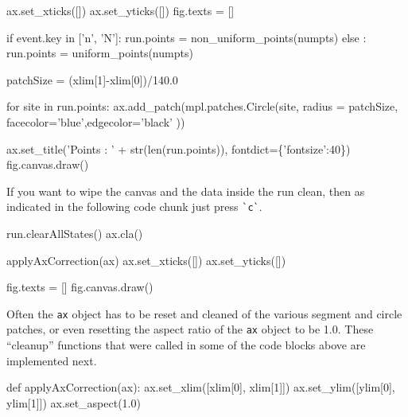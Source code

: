 ax.set_xticks([])
ax.set_yticks([])
fig.texts = []
                 
if event.key in ['n', 'N']: 
        run.points = non_uniform_points(numpts)
else : 
        run.points = uniform_points(numpts)

patchSize  = (xlim[1]-xlim[0])/140.0

for site in run.points:      
    ax.add_patch(mpl.patches.Circle(site, radius = patchSize, \\
                 facecolor='blue',edgecolor='black' ))

ax.set_title('Points : ' + str(len(run.points)), fontdict=\{'fontsize':40\})
fig.canvas.draw()
\nwendcode{}\nwdocspar

If you want to wipe the canvas and the data inside the run clean, then as indicated in the following code
chunk just press \verb|`c`|. 

\nwenddocs{}\endmoddef\nwstartdeflinemarkup{}\nwenddeflinemarkup
run.clearAllStates()
ax.cla()
                                 
applyAxCorrection(ax)
ax.set_xticks([])
ax.set_yticks([])
                                    
fig.texts = []
fig.canvas.draw()
\nwendcode{}\nwdocspar





Often the \verb|ax| object has to be reset and cleaned of the various segment and circle patches, or even resetting the 
aspect ratio of the \verb|ax| object to be 1.0. These ``cleanup'' functions that were called in some of the code blocks above 
are implemented next. 

\nwenddocs{}\plusendmoddef\nwstartdeflinemarkup{}\nwenddeflinemarkup
def applyAxCorrection(ax):
      ax.set_xlim([xlim[0], xlim[1]])
      ax.set_ylim([ylim[0], ylim[1]])
      ax.set_aspect(1.0)

